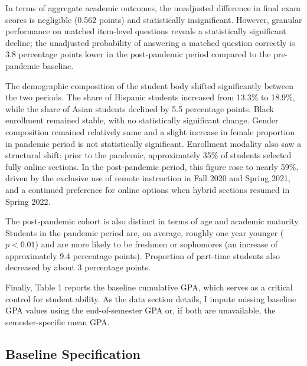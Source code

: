 \documentclass[
  12pt,
  letterpaper,
  DIV=11,
  numbers=noendperiod]{scrartcl}
\begin{document}
In terms of aggregate academic outcomes, the unadjusted difference in
final exam scores is negligible (0.562 points) and statistically
insignificant. However, granular performance on matched item-level
questions reveals a statistically significant decline; the unadjusted
probability of answering a matched question correctly is 3.8 percentage
points lower in the post-pandemic period compared to the pre-pandemic
baseline.

The demographic composition of the student body shifted significantly
between the two periods. The share of Hispanic students increased from
13.3\% to 18.9\%, while the share of Asian students declined by 5.5
percentage points. Black enrollment remained stable, with no
statistically significant change. Gender composition remained relatively
same and a slight increase in female proportion in pandemic period is
not statistically significant. Enrollment modality also saw a structural
shift: prior to the pandemic, approximately 35\% of students selected
fully online sections. In the post-pandemic period, this figure rose to
nearly 59\%, driven by the exclusive use of remote instruction in Fall
2020 and Spring 2021, and a continued preference for online options when
hybrid sections resumed in Spring 2022.

The post-pandemic cohort is also distinct in terms of age and academic
maturity. Students in the pandemic period are, on average, roughly one
year younger (\(p < 0.01\)) and are more likely to be freshmen or
sophomores (an increase of approximately 9.4 percentage points).
Proportion of part-time students also decreased by about 3 percentage
points.

Finally, Table 1 reports the baseline cumulative GPA, which serves as a
critical control for student ability. As the data section details, I
impute missing baseline GPA values using the end-of-semester GPA or, if
both are unavailable, the semester-specific mean GPA.

\subsection{Baseline Specification}\label{baseline-specification}
\end{document}
